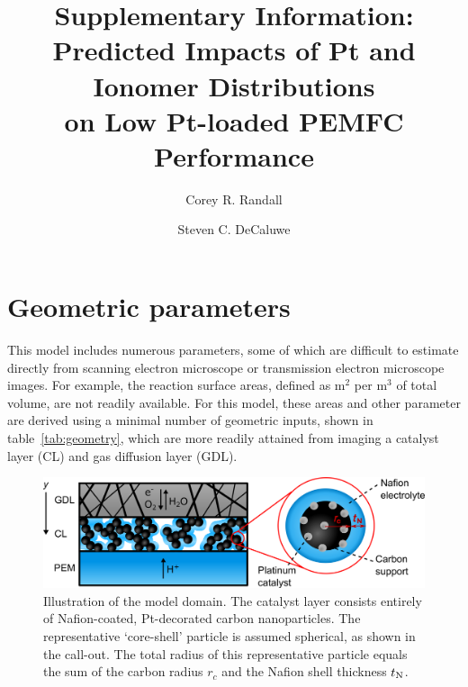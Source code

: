 \documentclass[final,3p,times,onecolumn]{elsarticle}    %
\begin{document}
\begin{frontmatter}
\title{Supplementary Information: Predicted Impacts of Pt and Ionomer Distributions \\ 
       on Low Pt-loaded PEMFC Performance}

\author[CSM]{Corey R. Randall}
\author[CSM]{Steven C. DeCaluwe }
        
\address[CSM]{Colorado School of Mines, 1500 Illinois St, Golden, CO 80401}
\end{frontmatter}

\section{Geometric parameters}
This model includes numerous parameters, some of which are difficult to estimate directly from scanning electron microscope or transmission electron microscope images. For example, the reaction surface areas, defined as m$^2$ per m$^3$ of total volume, are not readily available. For this model, these areas and other parameter are derived using a minimal number of geometric inputs, shown in table~\ref{tab:geometry}, which are more readily attained from imaging a catalyst layer (CL) and gas diffusion layer (GDL).

\begin{figure}[H]
    \centering
    \includegraphics[width=5.718in]{figures/core_shell_SI.png}
    \caption{Illustration of the model domain. The catalyst layer consists entirely of Nafion-coated, Pt-decorated carbon nanoparticles. The representative `core-shell' particle is assumed spherical, as shown in the call-out. The total radius of this representative particle equals the sum of the carbon radius $r_c$ and the Nafion shell thickness $t_{\rm N}$.}
    \label{fig:core_shell_SI}
\end{figure}
\end{document}
